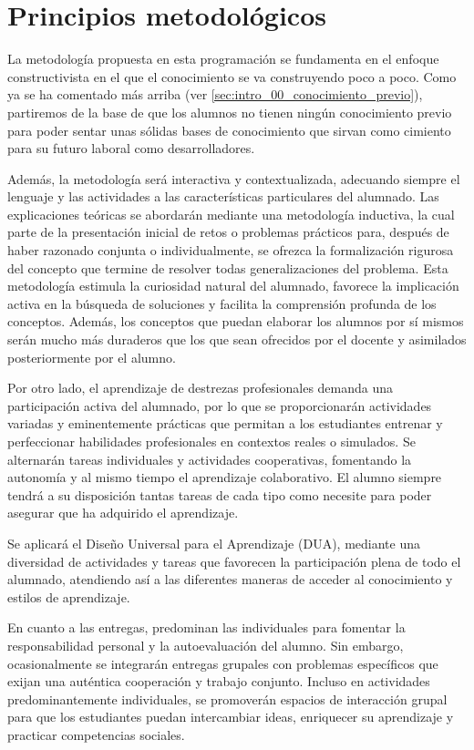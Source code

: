\section{Principios metodológicos}

La metodología propuesta en esta programación se fundamenta en el enfoque constructivista en el que el conocimiento se va construyendo poco a poco. Como ya se ha comentado más arriba (ver \ref{sec:intro_00_conocimiento_previo}), partiremos de la base de que los alumnos no tienen ningún conocimiento previo para poder sentar unas sólidas bases de conocimiento que sirvan como cimiento para su futuro laboral como desarrolladores.

Además, la metodología será interactiva y contextualizada, adecuando siempre el lenguaje y las actividades a las características particulares del alumnado. Las explicaciones teóricas se abordarán mediante una metodología inductiva, la cual parte de la presentación inicial de retos o problemas prácticos para, después de haber razonado conjunta o individualmente, se ofrezca la formalización rigurosa del concepto que termine de resolver todas generalizaciones del problema.
%
Esta metodología estimula la curiosidad natural del alumnado, favorece la implicación activa en la búsqueda de soluciones y facilita la comprensión profunda de los conceptos. 
%
Además, los conceptos que puedan elaborar los alumnos por sí mismos serán mucho más duraderos que los que sean ofrecidos por el docente y asimilados posteriormente por el alumno. 


Por otro lado, el aprendizaje de destrezas profesionales demanda una participación activa del alumnado, por lo que se proporcionarán actividades variadas y eminentemente prácticas que permitan a los estudiantes entrenar y perfeccionar habilidades profesionales en contextos reales o simulados. Se alternarán tareas individuales y actividades cooperativas, fomentando la autonomía y al mismo tiempo el aprendizaje colaborativo.
%
El alumno siempre tendrá a su disposición tantas tareas de cada tipo como necesite para poder asegurar que ha adquirido el aprendizaje.

Se aplicará el  Diseño Universal para el Aprendizaje (DUA), mediante una diversidad de actividades y tareas que favorecen la participación plena de todo el alumnado, atendiendo así a las diferentes maneras de acceder al conocimiento y estilos de aprendizaje.

En cuanto a las entregas, predominan las individuales para fomentar la responsabilidad personal y la autoevaluación del alumno. Sin embargo, ocasionalmente se integrarán entregas grupales con problemas específicos que exijan una auténtica cooperación y trabajo conjunto. Incluso en actividades predominantemente individuales, se promoverán espacios de interacción grupal para que los estudiantes puedan intercambiar ideas, enriquecer su aprendizaje y practicar competencias sociales.

